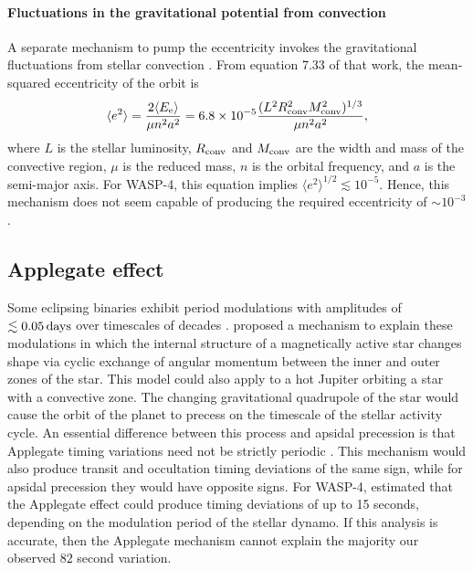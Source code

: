 \documentclass[12pt,twocolumn,tighten]{aastex62}
\begin{document}
\paragraph{Fluctuations in the gravitational potential from convection}
A separate mechanism to pump the eccentricity invokes the
gravitational fluctuations from stellar convection \citep[][Section
7]{phinney_pulsars_1992}.  From equation 7.33 of that work, the
mean-squared eccentricity of the orbit is
\begin{equation}
  \langle e^2 \rangle =
  \frac{ 2 \langle E_{\rm e} \rangle }{\mu n^2 a^2}
  = 6.8\times10^{-5}
  \frac{(L^2 R_{\rm conv}^2 M_{\rm conv}^2)^{1/3}}{\mu n^2 a^2},
\end{equation}
where $L$ is the stellar luminosity, $R_{\rm conv}$ and $M_{\rm conv}$
are the width and mass of the convective region, $\mu$ is the reduced
mass, $n$ is the orbital frequency, and $a$ is the semi-major axis.
For WASP-4, this equation implies $\langle e^2 \rangle^{1/2} \lesssim
10^{-5}$.  Hence, this mechanism does not seem capable of producing
the required eccentricity of $\sim$$10^{-3}$.


\subsection{Applegate effect}

Some eclipsing binaries exhibit period modulations with amplitudes of
$\lesssim 0.05\,{\rm days}$ over timescales of decades \citep[{\it
    e.g.},][]{soderhjelm_geometry_1980,hall_relation_1989}.
\citet{applegate_mechanism_1992} proposed a mechanism to explain these
modulations in which the internal structure of a magnetically active
star changes shape via cyclic exchange of angular momentum between the
inner and outer zones of the star.  This model could also apply to a
hot Jupiter orbiting a star with a convective zone.  The changing
gravitational quadrupole of the star would cause the orbit of the
planet to precess on the timescale of the stellar activity cycle.  An
essential difference between this process and apsidal precession is
that Applegate timing variations need not be strictly periodic
\citep[{\it e.g.},][Figure~12]{soderhjelm_geometry_1980}. This
mechanism would also produce transit and occultation timing deviations
of the same sign, while for apsidal precession they would have
opposite signs.  For WASP-4, \citet{watson_orbital_2010} estimated
that the Applegate effect could produce timing deviations of up to 15
seconds, depending on the modulation period of the stellar dynamo.
If this
analysis is accurate, then the Applegate mechanism cannot explain the
majority our observed $82$ second variation.
\end{document}
